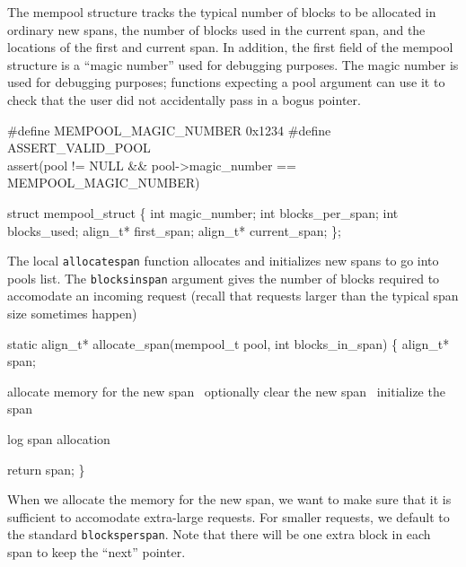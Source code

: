 The mempool structure tracks the typical number of blocks
to be allocated in ordinary new spans, the number of blocks
used in the current span, and the locations of the first and
current span.  In addition, the first field of the mempool
structure is a ``magic number'' used for debugging purposes.
The magic number is used for debugging purposes;
functions expecting a pool argument can use it to check that
the user did not accidentally pass in a bogus pointer.

\nwenddocs{}\endmoddef
#define MEMPOOL_MAGIC_NUMBER 0x1234
#define ASSERT_VALID_POOL \\
    assert(pool != NULL && pool->magic_number == MEMPOOL_MAGIC_NUMBER)

struct mempool_struct \{
    int magic_number;
    int blocks_per_span;
    int blocks_used;
    align_t* first_span;
    align_t* current_span;
\};

\nwendcode{}\nwdocspar

The local {\tt{}allocate{}span} function allocates and initializes new
spans to go into pools list.  The {\tt{}blocks{}in{}span} argument
gives the number of blocks required to accomodate an incoming
request (recall that requests larger than the typical span size
sometimes happen)

\nwenddocs{}\endmoddef
static align_t* allocate_span(mempool_t pool, int blocks_in_span)
\{
    align_t* span;

    \LA{}allocate memory for the new span~{\nwtagstyle{}}\RA{}
    \LA{}optionally clear the new span~{\nwtagstyle{}}\RA{}
    \LA{}initialize the span~{\nwtagstyle{}}\RA{}

    \LA{}log span allocation~{\nwtagstyle{}}\RA{}

    return span;
\}

\nwendcode{}\nwdocspar

When we allocate the memory for the new span, we want to make
sure that it is sufficient to accomodate extra-large requests.
For smaller requests, we default to the standard {\tt{}blocks{}per{}span}.
Note that there will be one extra block in each span to keep
the ``next'' pointer.

